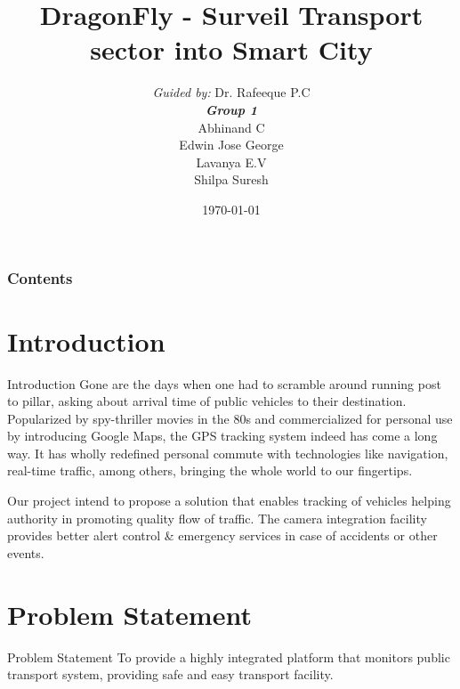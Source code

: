 \documentclass{beamer}
\title[DragonFly]{DragonFly - Surveil Transport sector into Smart City}
\author[Group 3]{
	{\small \textit{Guided by:}} Dr. Rafeeque P.C \\
	\medskip
	{\small \textbf{\textit{Group 1}}} \\
	Abhinand C \\
	Edwin Jose George \\
	Lavanya E.V \\
	Shilpa Suresh
}
\institute[GCEK]{Government College of Engineering Kannur}
\date{\today}
\begin{document}
\begin{frame}
\titlepage
\end{frame}

\begin{frame}
\frametitle{Contents}
\tableofcontents
\end{frame}


\section{Introduction}
\begin{frame}{Introduction}
	Gone are the days when one had to scramble around running post to pillar, asking about arrival time of public vehicles to their destination. Popularized by spy-thriller movies in the 80s and commercialized for personal use by introducing Google Maps, the GPS tracking system indeed has come a long way. It has wholly redefined personal commute with technologies like navigation, real-time traffic, among others, bringing the whole world to our fingertips. 
	
    Our project intend to propose a solution that enables tracking of vehicles helping authority in promoting quality flow of traffic. The camera integration facility provides better alert control \& emergency services in case of accidents or other events.
\end{frame}
\section{Problem Statement}
\begin{frame}{Problem Statement}
	To provide a highly integrated platform that monitors public transport system, providing safe and easy transport facility.
\end{frame}

\end{document}
